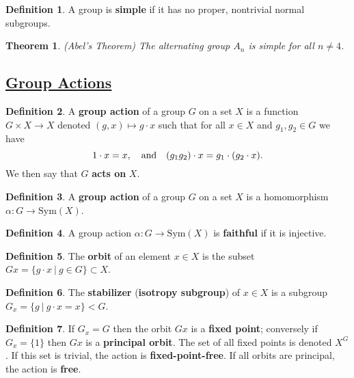 \documentclass[11pt]{amsart}
\newtheorem*{theorem*}{Theorem}
\theoremstyle{definition}
\newtheorem*{definition*}{Definition}
\renewcommand\:{\colon}
\newcommand{\1}{\mathds{1}}
\newcommand{\Sym}{\text{Sym}}
\begin{document}
\begin{definition*}
	A group is \textbf{simple} if it has no proper, nontrivial normal subgroups.
\end{definition*}

\begin{theorem*}
	\textnormal{(Abel's Theorem)} The alternating group $A_n$ is simple for all $n \neq 4$.
\end{theorem*}
\vskip20pt



\subsection*{\underline{Group Actions}}

\begin{definition*}
	A \textbf{group action} of a group $G$ on a set $X$ is a function $G \times X \to X$ denoted $(g, x) \mapsto g \cdot x$ such that for all $x \in X$ and $g_1, g_2 \in G$ we have
		\[ 1\cdot x = x, \hskip10pt \text{and} \hskip10pt (g_1g_2) \cdot x = g_1 \cdot (g_2 \cdot x). \]
	We then say that $G$ \textbf{acts on} $X$.
\end{definition*}

\begin{definition*}
	A \textbf{group action} of a group $G$ on a set $X$ is a homomorphism $\alpha\: G \to \Sym(X)$.
\end{definition*}

\begin{definition*}
	A group action $\alpha\: G \to \Sym(X)$ is \textbf{faithful} if it is injective.
\end{definition*}

\begin{definition*}
	The \textbf{orbit} of an element $x \in X$ is the subset $Gx = \{ g \cdot x \ | \ g \in G\} \subset X$.
\end{definition*}

\begin{definition*}
	The \textbf{stabilizer} (\textbf{isotropy subgroup}) of $x \in X$ is a subgroup $G_x = \{ g \ | \ g \cdot x = x \} < G$.
\end{definition*}

\begin{definition*}
	If $G_x = G$ then the orbit $Gx$ is a \textbf{fixed point}; conversely if $G_x = \{1\}$ then $Gx$ is a \textbf{principal orbit}. The set of all fixed points is denoted $X^G$. If this set is trivial, the action is \textbf{fixed-point-free}. If all orbits are principal, the action is \textbf{free}.
\end{definition*}
\end{document}

